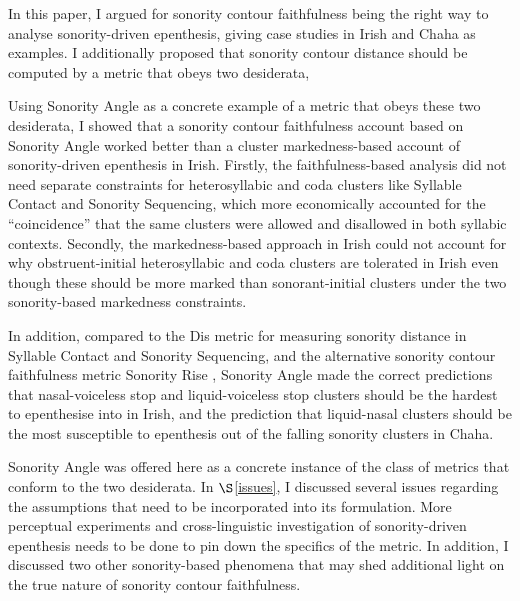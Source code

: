 \documentclass[12pt]{article}
\begin{document}
In this paper, I argued for sonority contour faithfulness being the right way to analyse sonority-driven epenthesis, giving case studies in Irish and Chaha as examples. I additionally proposed that sonority contour distance should be computed by a metric that obeys two desiderata, %

Using {\sc Sonority Angle} as a concrete example of a metric that obeys these two desiderata, I showed that  a sonority contour faithfulness account based on {\sc Sonority Angle} worked better than a cluster markedness-based account of sonority-driven epenthesis in Irish. Firstly, the faithfulness-based analysis did not need separate constraints for heterosyllabic and coda clusters like Syllable Contact and Sonority Sequencing, which more economically accounted for the ``coincidence'' that the same clusters were allowed and disallowed in both syllabic contexts. Secondly, the markedness-based approach in Irish could not account for why obstruent-initial heterosyllabic and coda clusters are tolerated in Irish even though these should be more marked than sonorant-initial clusters under the two sonority-based markedness constraints.

In addition, compared to the {\sc *Dis} metric \citep{gouskova.2002} for measuring sonority distance in Syllable Contact and Sonority Sequencing, and the alternative sonority contour faithfulness metric {\sc Sonority Rise} \citep{flemming.2008}, {\sc Sonority Angle} made the correct predictions that nasal-voiceless stop and liquid-voiceless stop clusters should be the hardest to epenthesise into in Irish, and the prediction that liquid-nasal clusters should be the most susceptible to epenthesis out of the falling sonority clusters in Chaha.

{\sc Sonority Angle} was offered here as a concrete instance of the class of metrics that conform to the two desiderata. In $\S$\ref{issues}, I discussed several issues regarding the assumptions that need to be incorporated into its formulation. More perceptual experiments and cross-linguistic investigation of sonority-driven epenthesis needs to be done to pin down the specifics of the metric. In addition, I discussed two other sonority-based phenomena that may shed additional light on the true nature of sonority contour faithfulness.



\end{document}
